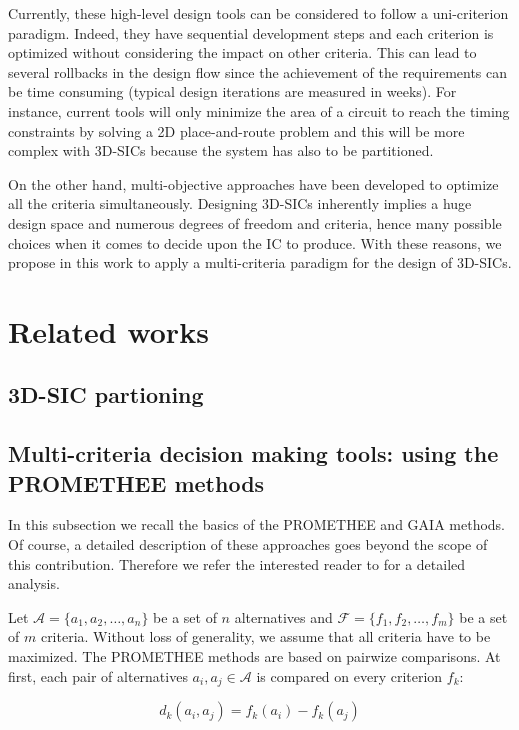 \documentclass{svmono}
\begin{document}
Currently, these high-level design tools can be considered to follow a uni-criterion paradigm. Indeed, they have sequential development steps and each criterion is optimized without considering the impact on other criteria. This can lead to several rollbacks in the design flow since the achievement of the requirements can be time consuming (typical design iterations are measured in weeks). For instance, current tools will only minimize the area of a circuit to reach the timing constraints by solving a 2D place-and-route problem and this will be more complex with 3D-SICs because the system has also to be partitioned.

On the other hand, multi-objective approaches have been developed to optimize all the criteria simultaneously. Designing 3D-SICs inherently implies a huge design space and numerous degrees of freedom and criteria, hence many possible choices when it comes to decide upon the IC to produce. With these reasons, we propose in this work to apply a multi-criteria paradigm for the design of 3D-SICs.

\section{Related works}

\subsection{3D-SIC partioning}

\subsection{Multi-criteria decision making tools: using the PROMETHEE methods}

In this subsection we recall the basics of the PROMETHEE and GAIA methods. Of course, a detailed description of these approaches goes beyond the scope of this contribution. Therefore we refer the interested reader to \cite{BraMar2005} for a detailed analysis.

Let $\mathcal{A}=\{a_1,a_2,\ldots,a_n\}$ be a set of $n$ alternatives and $\mathcal{F}=\{f_1,f_2,\ldots,f_m\}$ be a set of $m$ criteria. Without loss of generality, we assume that all criteria have to be maximized. The PROMETHEE methods are based on pairwize comparisons. At first, each pair of alternatives $a_i,a_j \in \mathcal{A}$ is compared on every criterion $f_k$:

$$
d_k(a_i,a_j) = f_k(a_i) - f_k(a_j)
$$
\end{document}
